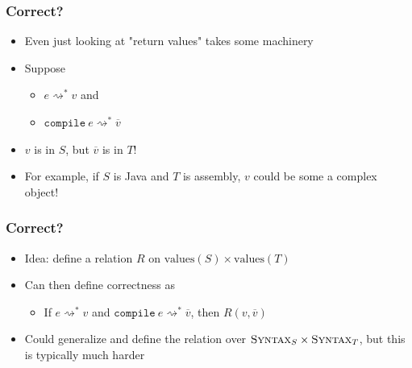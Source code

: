 \documentclass[usenames,dvipsnames]{beamer}
\newcommand{\compile}{\texttt{compile}}
\newcommand{\syn}{\textsc{Syntax}}
\begin{document}

\begin{frame}
  \frametitle{Correct?}

  \begin{itemize}
    \item Even just looking at "return values" takes some machinery

    \item Suppose
      \begin{itemize}
        \item $e \rightsquigarrow^* v$ and
        \item $\compile\ e \rightsquigarrow^* \overline{v}$
      \end{itemize}

    \item $v$ is in $S$, but $\overline{v}$ is in $T$!

    \item For example, if $S$ is Java and $T$ is assembly, $v$ could be some
      a complex object!
  \end{itemize}
\end{frame}


\begin{frame}
  \frametitle{Correct?}

  \begin{itemize}
    \item Idea: define a relation $R$ on $\text{values}(S) \times
      \text{values}(T)$

    \item Can then define correctness as
      \begin{itemize}
        \item If $e \rightsquigarrow^* v$ and $\compile\ e \rightsquigarrow^*
          \overline{v}$, then $R(v, \overline{v})$
      \end{itemize}

    \item Could generalize and define the relation over $\syn_S \times \syn_T$,
      but this is typically much harder
  \end{itemize}
\end{frame}

\end{document}
